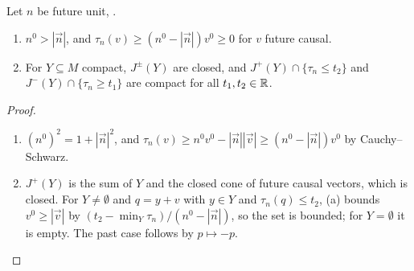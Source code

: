 \begin{lemma}\label{lem:mink-compact}
Let $n$ be future unit, .
\begin{enumerate}[label=(\alph*),leftmargin=2.5em]
\item $n^0>|\vec n|$, and $\tau_n(v)\geq(n^0-|\vec n|)v^0\geq0$ for $v$ future causal.
\item For $Y\subseteq M$ compact, $J^\pm(Y)$ are closed, and $J^+(Y)\cap\{\tau_n\leq t_2\}$ and
$J^-(Y)\cap\{\tau_n\geq t_1\}$ are compact for all $t_1,t_2\in\mathbb R$.
\end{enumerate}
\end{lemma}
\begin{proof}
\begin{enumerate}[leftmargin=2.5em]
\item[(a)] $(n^0)^2=1+|\vec n|^2$, and $\tau_n(v)\geq n^0v^0-|\vec n||\vec v|\geq(n^0-|\vec n|)v^0$ by
Cauchy--Schwarz.
\item[(b)] $J^+(Y)$ is the sum of $Y$ and the closed cone of future causal vectors, which is closed.
For $Y\neq\emptyset$ and $q=y+v$ with $y\in Y$ and $\tau_n(q)\leq t_2$, (a) bounds $v^0\geq|\vec v|$ by
$(t_2-\min_Y\tau_n)/(n^0-|\vec n|)$, so the set is bounded; for $Y=\emptyset$ it is empty. The past
case follows by $p\mapsto-p$.
\end{enumerate}
\end{proof}

